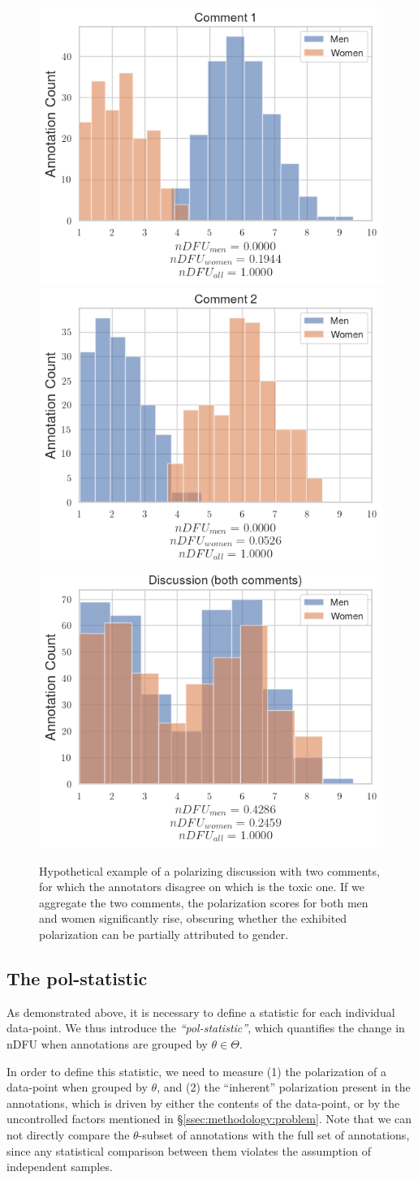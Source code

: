 \documentclass{article}
\begin{document}
\begin{figure}
	\centering
    \includegraphics[width=0.3\linewidth]{ndfu_comment1.png}
    \includegraphics[width=0.3 \linewidth]{ndfu_comment2.png}
	\includegraphics[width=0.3 \linewidth]{ndfu_discussion.png}
	\caption{Hypothetical example of a polarizing discussion with two comments, for which the annotators disagree on which is the toxic one. If we aggregate the two comments, the polarization scores for both men and women significantly rise, obscuring whether the exhibited polarization can be partially attributed to gender.}
	\label{fig:ndfu_discussion}
\end{figure}

 
 
 \subsection{The pol-statistic}
 \label{ssec:methodology:polstat}
  
As demonstrated above, it is necessary to define a statistic for each individual data-point. We thus introduce the \textit{``pol-statistic''}, which quantifies the change in \ac{nDFU} when annotations are grouped by $\theta \in \Theta$.

In order to define this statistic, we need to measure (1) the polarization of a data-point when grouped by $\theta$, and (2) the ``inherent'' polarization present in the annotations, which is driven by either the contents of the data-point, or by the uncontrolled factors mentioned in \S\ref{ssec:methodology:problem}. Note that we can not directly compare the $\theta$-subset of annotations with the full set of annotations, since any statistical comparison between them violates the assumption of independent samples. %
\end{document}

